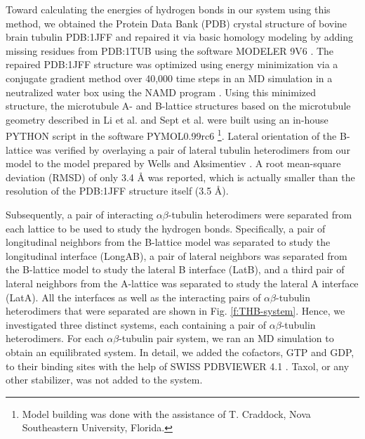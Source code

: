 \documentclass[11pt]{report}
\begin{document}
Toward calculating the energies of hydrogen bonds in our system using this method, we obtained the Protein Data Bank (PDB)
\cite{Bernstein1978} crystal structure of bovine brain tubulin PDB:1JFF
\cite{Lowe2001} and repaired it via basic homology modeling by adding missing residues from PDB:1TUB
\cite{Nogales1998} using the software MODELER 9V6
\cite{Sali1993}. 
The repaired PDB:1JFF structure was optimized using energy minimization via a conjugate gradient method over 40,000 time steps in an MD simulation in a neutralized water box using the NAMD program
\cite{Phillips2005}. 
Using this minimized structure, the microtubule A- and B-lattice structures based on the microtubule geometry described in Li et al.
\cite{Li2002} and Sept et al.
\cite{Sept2003} were built using an in-house PYTHON script in the software PYMOL0.99rc6
\cite{PyMol} \footnote{Model building was done with the assistance of
T. Craddock, Nova Southeastern University, Florida.}. 
Lateral orientation of the B-lattice was verified by overlaying a pair of lateral tubulin heterodimers from our model to the model prepared by Wells and Aksimentiev
\cite{Wells2010}. 
A root mean-square deviation (RMSD) of only 3.4 \r{A}
was reported, which is actually smaller than the resolution of the PDB:1JFF structure itself (3.5 \r{A}).

Subsequently, a pair of interacting $\alpha$$\beta$-tubulin heterodimers were separated from each lattice to be used to study the hydrogen bonds. Specifically, a pair of longitudinal neighbors from the B-lattice model was separated to study the longitudinal interface (LongAB), a pair of lateral neighbors was separated from the B-lattice model to study the lateral B interface (LatB), and a third pair of lateral neighbors from the A-lattice was separated to study the lateral A interface (LatA). All the interfaces as well as the interacting pairs of $\alpha$$\beta$-tubulin heterodimers that were separated are shown in 
Fig. \ref{f:THB-system}. 
Hence, we investigated three distinct systems, each containing a pair of $\alpha$$\beta$-tubulin heterodimers. For each $\alpha$$\beta$-tubulin pair system, we ran an MD simulation to obtain an equilibrated system. In detail, we added the cofactors, GTP and GDP, to their binding sites with the help of SWISS PDBVIEWER 4.1
\cite{Guex1997}. 
Taxol, or any other stabilizer, was not added to the system.
\end{document}
